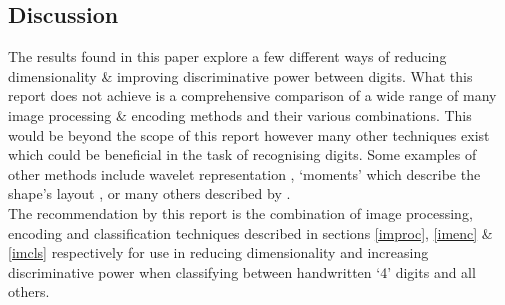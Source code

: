 \documentclass[12pt]{article}
\begin{document}
  \subsection{Discussion}
    The results found in this paper explore a few different ways of reducing dimensionality \& improving discriminative power between digits. What this report does not achieve is a comprehensive comparison of a wide range of many image processing \& encoding methods and their various combinations. This would be beyond the scope of this report however many other techniques exist which could be beneficial in the task of recognising digits. Some examples of other methods include wavelet representation \citep{mallat1989theory}, ‘moments’ which describe the shape's layout \citep{hu1962visual}, or many others described by \cite{zhang2004review}.\\
    The recommendation by this report is the combination of image processing, encoding and classification techniques described in sections \ref{improc}, \ref{imenc} \& \ref{imcls} respectively for use in reducing dimensionality and increasing discriminative power when classifying between handwritten ‘4’ digits and all others.

\newpage



\end{document}
